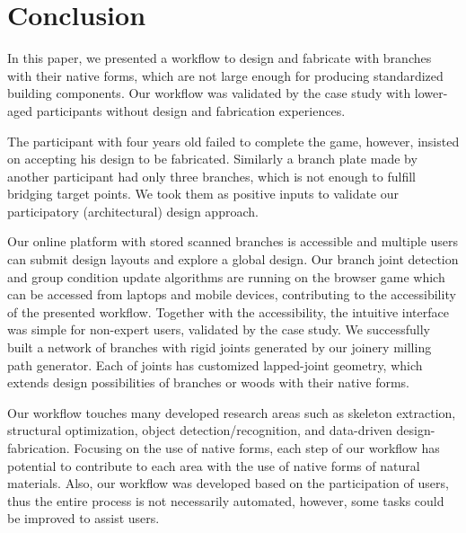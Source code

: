 \section{Conclusion}
In this paper, we presented a workflow to design and fabricate with branches with their native forms, which are not large enough for producing standardized building components.
Our workflow was validated by the case study with lower-aged participants without design and fabrication experiences.


The participant with four years old failed to complete the game, however, insisted on accepting his design to be fabricated.
Similarly a branch plate made by another participant had only three branches, which is not enough to fulfill bridging target points.
We took them as positive inputs to validate our participatory (architectural) design approach.

Our online platform with stored scanned branches is accessible and multiple users can submit design layouts and explore a global design. %
Our branch joint detection and group condition update algorithms are running on the browser game which can be accessed from laptops and mobile devices, contributing to the accessibility of the presented workflow.
Together with the accessibility, the intuitive interface was simple for non-expert users, validated by the case study.
We successfully built a network of branches with rigid joints generated by our joinery milling path generator.
Each of joints has customized lapped-joint geometry, which extends design possibilities of branches or woods with their native forms.

Our workflow touches many developed research areas such as skeleton extraction, structural optimization, object detection/recognition, and data-driven design-fabrication.
Focusing on the use of native forms, each step of our workflow has potential to contribute to each area with the use of native forms of natural materials.
Also, our workflow was developed based on the participation of users, thus the entire process is not necessarily automated, however, some tasks could be improved to assist users.\\

